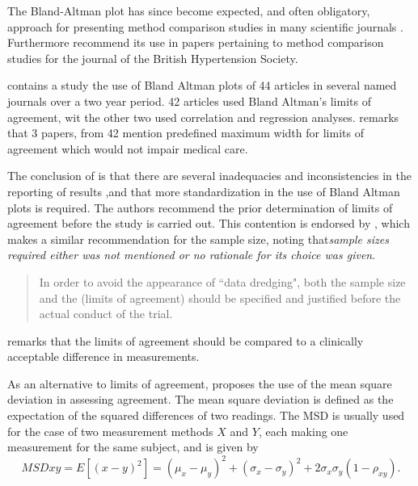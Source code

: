 \documentclass[12pt, a4paper]{report}
\theoremstyle{plain}
\theoremstyle{definition}
\theoremstyle{remark}
\begin{document}
The Bland-Altman plot has since become expected, and
often obligatory, approach for presenting method comparison
studies in many scientific journals \citep{hollis}. Furthermore
\citet{BritHypSoc} recommend its use in papers pertaining to
method comparison studies for the journal of the British
Hypertension Society.


\citet{mantha} contains a study the use of Bland Altman plots of
44 articles in several named journals over a two year period. 42
articles used Bland Altman's limits of agreement, wit the other
two used correlation and regression analyses. \citet{mantha}
remarks that 3 papers, from 42 mention predefined maximum width
for limits of agreement which would not impair medical care.

The conclusion of \citet{mantha} is that there are several
inadequacies and inconsistencies in the reporting of results ,and
that more standardization in the use of Bland Altman plots is
required. The authors recommend the prior determination of limits
of agreement before the study is carried out. This contention is
endorsed by \citet{lin}, which makes a similar recommendation for
the sample size, noting that\emph{sample sizes required either was
	not mentioned or no rationale for its choice was given}.

\begin{quote}
	In order to avoid the appearance of ``data dredging", both the
	sample size and the (limits of agreement) should be specified and
	justified before the actual conduct of the trial. \citep{lin}
\end{quote}

\citet{Dewitte} remarks that the limits of agreement should be
compared to a clinically acceptable difference in measurements.

As an alternative to limits of agreement, \citet{lin2002} proposes the use of
the mean square deviation in assessing agreement. The mean square
deviation is defined as the expectation of the squared differences
of two readings. The MSD is usually used for the case of two
measurement methods $X$ and $Y$, each making one measurement for
the same subject, and is given by
\[
MSDxy = E[(x - y)^2]  = (\mu_{x} - \mu_{y})^2 + (\sigma_{x} -
\sigma_{y})^2 + 2\sigma_{x}\sigma_{y}(1-\rho_{xy}).
\]
\end{document}
